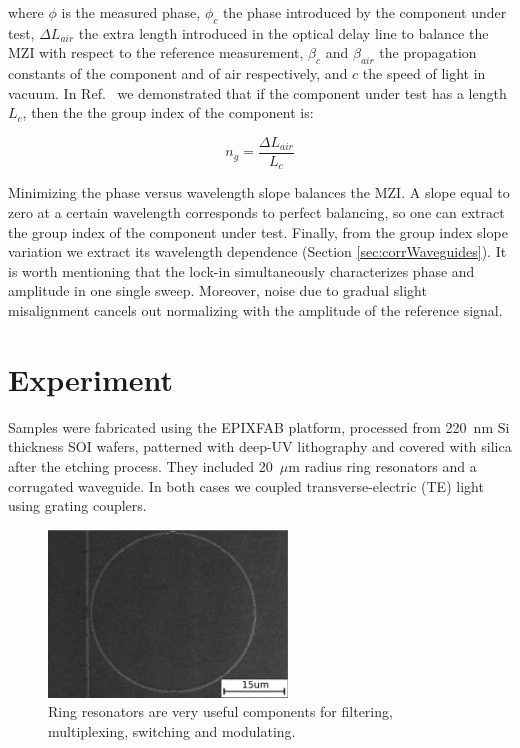 \documentclass[journal]{IEEEtran}
\begin{document}
where $\phi$ is the measured phase, $\phi_{c}$ the phase introduced by the component under test, $\Delta L_{air}$ the extra length introduced in the optical delay line to balance the MZI with respect to the reference measurement, $\beta_c$ and $\beta_{air}$ the propagation constants of the component and of air respectively, and $c$ the speed of light in vacuum.
In Ref.~\cite{Mas2012} we demonstrated that if the component under test has a length $L_{c}$, then the the group index of the component is:

\begin{equation}
  n_{g} = \frac{\Delta L_{air}}{L_{c}}
  \label{eq:group_index_pathBalancing}
\end{equation}

Minimizing the phase versus wavelength slope balances the MZI.
A slope equal to zero at a certain wavelength corresponds to perfect balancing, so one can extract the group index of the component under test.
Finally, from the group index slope variation we extract its wavelength dependence (Section \ref{sec:corrWaveguides}).
It is worth mentioning that the lock-in simultaneously characterizes phase and amplitude in one single sweep.
Moreover, noise due to gradual slight misalignment cancels out normalizing with the amplitude of the reference signal.

\section{Experiment}
Samples were fabricated using the EPIXFAB platform, processed from 220~nm Si thickness SOI wafers, patterned with deep-UV lithography and covered with silica after the etching process.
They included 20~$\mu$m radius ring resonators and a corrugated waveguide.
In both cases we coupled transverse-electric (TE) light using grating couplers.

\begin{figure}[htb]
    \centering
    \includegraphics[width=2.5in]{ringTEscale2}
    \caption{Ring resonators are very useful components for filtering, multiplexing, switching and modulating.}
    \label{fig:semRingPaperRings}
\end{figure}
\end{document}
